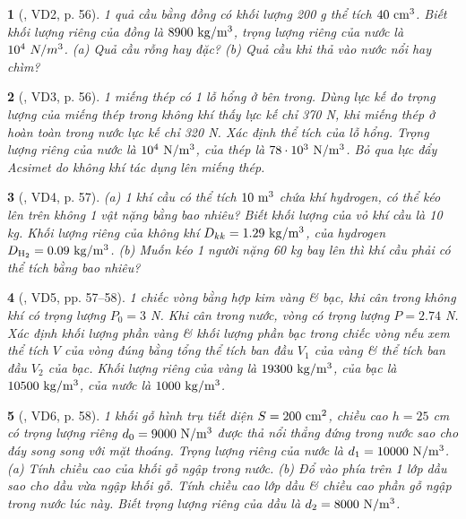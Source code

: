 \documentclass{article}
\newtheorem{baitoan}{}
\begin{document}
\begin{baitoan}[\cite{Van_Quyen_Hanh_Nhu_10_chuyen_Ly}, VD2, p. 56]
	1 quả cầu bằng đồng có khối lượng {\rm200 g} thể tích $\rm40\ cm^3$. Biết khối lượng riêng của đồng là $\rm8900\ kg{\tt/}m^3$, trọng lượng riêng của nước là $10^4\ N{\tt/}m^3$. (a) Quả cầu rỗng hay đặc? (b) Quả cầu khi thả vào nước nổi hay chìm?
\end{baitoan}

\begin{baitoan}[\cite{Van_Quyen_Hanh_Nhu_10_chuyen_Ly}, VD3, p. 56]
	1 miếng thép có 1 lỗ hổng ở bên trong. Dùng lực kế đo trọng lượng của miếng thép trong không khí thấy lực kế chỉ {\rm370 N}, khi miếng thép ở hoàn toàn trong nước lực kế chỉ {\rm320 N}. Xác định thể tích của lỗ hổng. Trọng lượng riêng của nước là $\rm10^4\ N{\tt/}m^3$, của thép là $\rm78\cdot 10^3\ N{\tt/}m^3$. Bỏ qua lực đẩy Acsimet do không khí tác dụng lên miếng thép.
\end{baitoan}

\begin{baitoan}[\cite{Van_Quyen_Hanh_Nhu_10_chuyen_Ly}, VD4, p. 57]
	(a) 1 khí cầu có thể tích $\rm10\ m^3$ chứa khí hydrogen, có thể kéo lên trên không 1 vật nặng bằng bao nhiêu? Biết khối lượng của vỏ khí cầu là {\rm10 kg}. Khối lượng riêng của không khí $D_{kk} = 1.29\ {\rm kg{\tt/}m^3}$, của hydrogen $D_{\rm H_2} = 0.09\ {\rm kg{\tt/}m^3}$. (b) Muốn kéo 1 người nặng {\rm60 kg} bay lên thì khí cầu phải có thể tích bằng bao nhiêu?
\end{baitoan}

\begin{baitoan}[\cite{Van_Quyen_Hanh_Nhu_10_chuyen_Ly}, VD5, pp. 57--58]
	1 chiếc vòng bằng hợp kim vàng \& bạc, khi cân trong không khí có trọng lượng $P_0 = 3$ {\rm N}. Khi cân trong nước, vòng có trọng lượng $P = 2.74$ {\rm N}. Xác định khối lượng phần vàng \& khối lượng phần bạc trong chiếc vòng nếu xem thể tích $V$ của vòng đúng bằng tổng thể tích ban đầu $V_1$ của vàng \& thể tích ban đầu $V_2$ của bạc. Khối lượng riêng của vàng là $\rm19300\ kg{\tt/}m^3$, của bạc là $\rm10500\ kg{\tt/}m^3$, của nước là $\rm1000\ kg{\tt/}m^3$.
\end{baitoan}

\begin{baitoan}[\cite{Van_Quyen_Hanh_Nhu_10_chuyen_Ly}, VD6, p. 58]
	1 khối gỗ hình trụ tiết diện $S = 200\ {\rm cm^2}$, chiều cao $h = 25$ {\rm cm} có trọng lượng riêng $d_0 = 9000\ {\rm N{\tt/}m^3}$ được thả nổi thẳng đứng trong nước sao cho đáy song song với mặt thoáng. Trọng lượng riêng của nước là $d_1 = 10000\ {\rm N{\tt/}m^3}$. (a) Tính chiều cao của khối gỗ ngập trong nước. (b) Đổ vào phía trên 1 lớp dầu sao cho dầu vừa ngập khối gỗ. Tính chiều cao lớp dầu \& chiều cao phần gỗ ngập trong nước lúc này. Biết trọng lượng riêng của dầu là $d_2 = 8000\ {\rm N{\tt/}m^3}$.
\end{baitoan}
\end{document}
